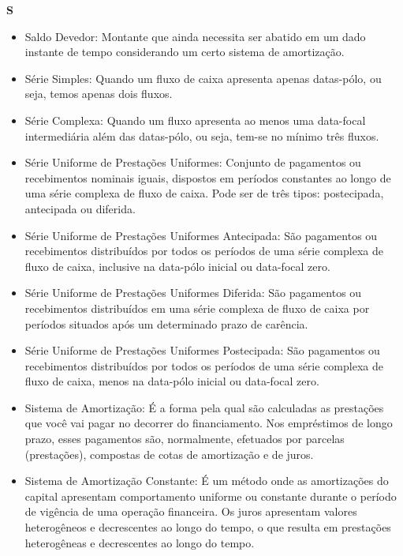 \textbf{S}
\begin{itemize}
 \item Saldo Devedor:
    Montante que ainda necessita ser abatido em um dado instante de tempo considerando um certo sistema de amortização. 

\item Série Simples:
    Quando um fluxo de caixa apresenta apenas datas-pólo, ou seja, temos apenas dois fluxos. 

\item Série Complexa:
    Quando um fluxo apresenta ao menos uma data-focal intermediária além das datas-pólo, ou seja, tem-se no mínimo três fluxos. 

\item Série Uniforme de Prestações Uniformes:
    Conjunto de pagamentos ou recebimentos nominais iguais, dispostos em períodos constantes ao longo de uma série complexa de fluxo de caixa. Pode ser de três tipos: postecipada, antecipada ou diferida. 

\item Série Uniforme de Prestações Uniformes Antecipada:
    São pagamentos ou recebimentos distribuídos por todos os períodos de uma série complexa de fluxo de caixa, inclusive na data-pólo inicial ou data-focal zero. 

\item Série Uniforme de Prestações Uniformes Diferida:
    São pagamentos ou recebimentos distribuídos em uma série complexa de fluxo de caixa por períodos situados após um determinado prazo de carência. 

\item Série Uniforme de Prestações Uniformes Postecipada:
    São pagamentos ou recebimentos distribuídos por todos os períodos de uma série complexa de fluxo de caixa, menos na data-pólo inicial ou data-focal zero. 

\item Sistema de Amortização:
    É a forma pela qual são calculadas as prestações que você vai pagar no decorrer do financiamento. Nos empréstimos de longo prazo, esses pagamentos são, normalmente, efetuados por parcelas (prestações), compostas de cotas de amortização e de juros. 

\item Sistema de Amortização Constante:
    É um método onde as amortizações do capital apresentam comportamento uniforme ou constante durante o período de vigência de uma operação financeira. Os juros apresentam valores heterogêneos e decrescentes ao longo do tempo, o que resulta em prestações heterogêneas e decrescentes ao longo do tempo. 


\end{itemize}
